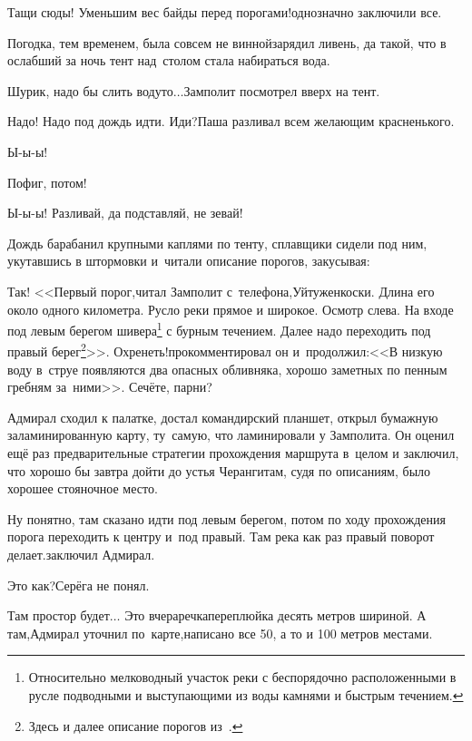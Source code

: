 \diagdash Тащи сюды! Уменьшим вес байды перед порогами!\mdash однозначно заключили все.

Погодка, тем временем, была совсем не винной\mdash зарядил ливень, да такой, что в ослабший за ночь тент над~столом стала набираться вода.

\diagdash Шурик, надо бы слить воду\sdash то$\ldots$\mdash Замполит посмотрел вверх на тент.

\diagdash Надо! Надо под дождь идти. Иди?\mdash Паша разливал всем желающим красненького.

\diagdash Ы-ы-ы!

\diagdash Пофиг, потом!

\diagdash Ы-ы-ы! Разливай, да подставляй, не зевай!

Дождь барабанил крупными каплями по тенту, сплавщики сидели под ним, укутавшись в штормовки и~читали описание порогов, закусывая:

\renewcommand*{\thefootnote}{\arabic{footnote}}
\setcounter{footnote}{0}
\diagdash Так! <<Первый порог,\mdash читал Замполит с~телефона,\mdash Уйтуженкоски. Длина его около одного километра. Русло реки прямое и широкое. Осмотр слева. На входе под левым берегом шивера\footnote{Относительно мелководный участок реки с беспорядочно расположенными в русле подводными и выступающими из воды камнями и быстрым течением.} с бурным течением. Далее надо переходить под правый берег\footnote{Здесь и далее описание порогов из~\cite{Шилов}.}>>. Охренеть!\mdash прокомментировал он и~продолжил:\mdash <<В низкую воду в~струе появляются два опасных обливняка, хорошо заметных по пенным гребням за~ними>>. Сечёте, парни?

Адмирал сходил к палатке, достал командирский планшет, открыл бумажную заламинированную карту, ту~самую, что ламинировали у Замполита. Он оценил ещё раз предварительные стратегии прохождения маршрута в~целом и заключил, что хорошо бы завтра дойти до устья Черанги\mdash там, судя по описаниям, было хорошее стояночное место.

\diagdash Ну понятно, там сказано идти под левым берегом, потом по ходу прохождения порога переходить к центру и~под правый. Там река как раз правый поворот делает.\mdash заключил Адмирал.

\diagdash Это как?\mdash Серёга не понял.

\diagdash Там простор будет$\ldots$ Это вчера\mdash речка\sdash переплюйка десять метров шириной. А там,\mdash Адмирал уточнил по~карте,\mdash написано все 50, а то и 100 метров местами.

